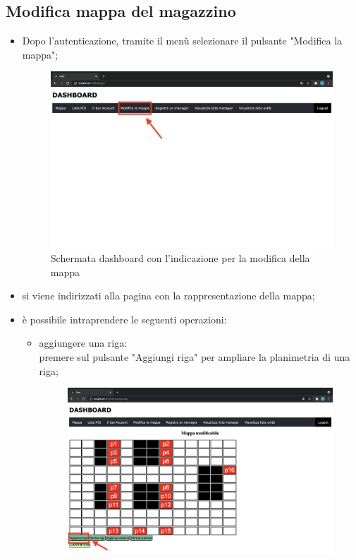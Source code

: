 \subsection{Modifica mappa del magazzino}
\begin{itemize}
    \item Dopo l'autenticazione, tramite il menù selezionare il pulsante "Modifica la mappa";
    \begin{figure}[H]
        \centering
        \includegraphics[scale=0.12]{res/images/dashboard6.png}
        \caption{Schermata dashboard con l'indicazione per la modifica della mappa}
    \end{figure}
    \item si viene indirizzati alla pagina con la rappresentazione della mappa;
    \item è possibile intraprendere le seguenti operazioni:
        \begin{itemize}
            \item aggiungere una riga: \\premere sul pulsante "Aggiungi riga" per ampliare la planimetria di una riga;
            \begin{figure}[H]
                \centering
                \includegraphics[scale=0.12]{res/images/modificamappa1.png}

\end{figure}
\end{itemize}
\end{itemize}
